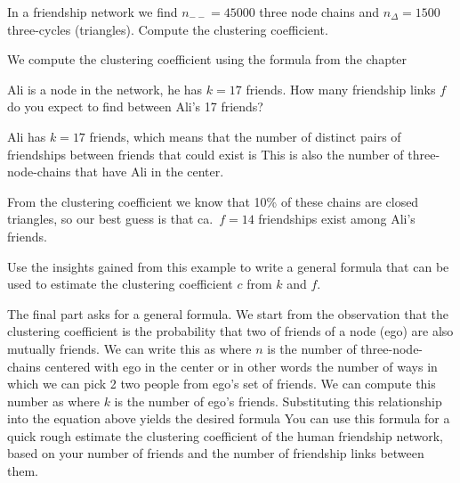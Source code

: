 
In a friendship network we find $n_{--}=45000$ three node chains and $n_{\Delta}=1500$ three-cycles (triangles). 
\subquestion Compute the clustering coefficient. 

\solution
We compute the clustering coefficient using the formula from the chapter

\subquestion Ali is a node in the network, he has $k=17$ friends. How many friendship links $f$ do you expect to find between Ali's 17 friends? 

\solution
Ali has $k= 17$ friends, which means that the number of distinct pairs of friendships between friends that could exist is 
This is also the number of three-node-chains that have Ali in the center. 

From the clustering coefficient we know that 10\% of these chains are closed triangles, so our best guess is that ca.~$f=14$ friendships exist among Ali's friends.

\subquestion Use the insights gained from this example to write a general formula that can be used to estimate the clustering coefficient $c$ from $k$ and $f$.    

\solution
The final part asks for a general formula. We start from the observation that the clustering coefficient is the probability that two of friends of a node (ego) are also mutually friends. We can write this as 
where $n$ is the number of three-node-chains centered with ego in the center or in other words the number of ways in which we can pick 2 two people from ego's set of friends. We can compute this number as
where $k$ is the number of ego's friends. Substituting this relationship into the equation above yields the desired formula
You can use this formula for a quick rough estimate the clustering coefficient of the human friendship network, based on your number of friends and the number of friendship links between them. 
